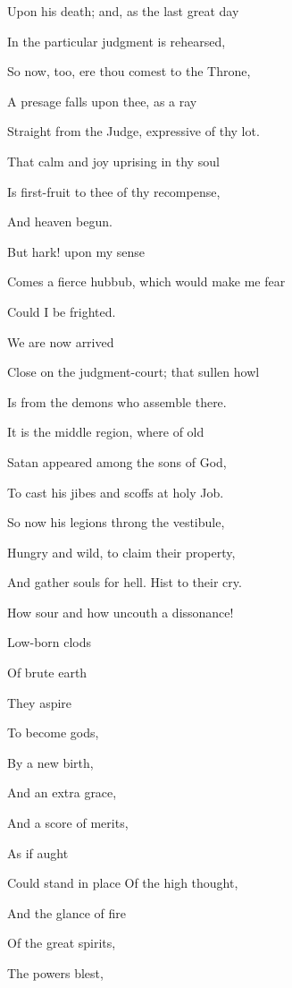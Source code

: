Upon his death; and, as the last great day

In the particular judgment is rehearsed,

So now, too, ere thou comest to the Throne,

A presage falls upon thee, as a ray

Straight from the Judge, expressive of thy lot.

That calm and joy uprising in thy soul

Is first-fruit to thee of thy recompense,

And heaven begun.


But hark! upon my sense

Comes a fierce hubbub, which would make me fear

Could I be frighted.


We are now arrived

Close on the judgment-court; that sullen howl

Is from the demons who assemble there.

It is the middle region, where of old

Satan appeared among the sons of God,

To cast his jibes and scoffs at holy Job.

So now his legions throng the vestibule,

Hungry and wild, to claim their property,

And gather souls for hell. Hist to their cry.


How sour and how uncouth a dissonance!


Low-born clods

Of brute earth

They aspire

To become gods,

By a new birth,

And an extra grace,

And a score of merits,

As if aught

Could stand in place Of the high thought,

And the glance of fire

Of the great spirits,

The powers blest,

